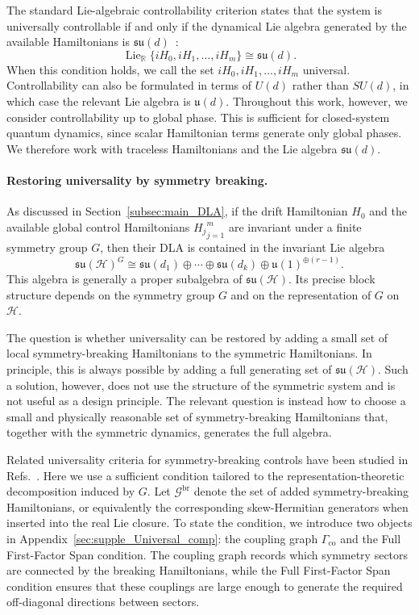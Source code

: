 \documentclass[10pt,twocolumn,superscriptaddress,aps,amsmath,amssymb,citeautoscript,floatfix,prx]{revtex4-2}
\newcounter{alg}
\theoremstyle{plain}
\theoremstyle{plain}
\theoremstyle{plain}
\theoremstyle{plain}
\theoremstyle{plain}
\theoremstyle{plain}
\theoremstyle{plain}
\theoremstyle{definition}
\theoremstyle{plain}
\begin{document}
The standard Lie-algebraic controllability criterion states that the system is universally controllable if and only if 
the dynamical Lie algebra generated by the available Hamiltonians is $\mathfrak{su}(d)$~\cite{Albertini2003}:
$$
\operatorname{Lie}_{\mathbb R}
\{iH_0,iH_1,\ldots,iH_m\}
\cong
\mathfrak{su}(d).
$$
When this condition holds, we call the set ${iH_0,iH_1,\ldots,iH_m}$ universal. Controllability can also be formulated in terms of $U(d)$ rather than $SU(d)$, 
in which case the relevant Lie algebra is $\mathfrak{u}(d)$. Throughout this work, however, we consider controllability up to global phase. 
This is sufficient for closed-system quantum dynamics, since scalar Hamiltonian terms generate only global phases. 
We therefore work with traceless Hamiltonians and the Lie algebra $\mathfrak{su}(d)$.

\paragraph{Restoring universality by symmetry breaking.}

As discussed in Section~\ref{subsec:main_DLA}, if the drift Hamiltonian $H_0$ and the available global control Hamiltonians ${H_j}_{j=1}^m$ are invariant under a finite symmetry group $G$, 
then their DLA is contained in the invariant Lie algebra
$$
\mathfrak{su}(\mathcal H)^G
\cong
\mathfrak{su}(d_1)
\oplus
\cdots
\oplus
\mathfrak{su}(d_k)
\oplus
\mathfrak{u}(1)^{\oplus(r-1)}.
$$
This algebra is generally a proper subalgebra of $\mathfrak{su}(\mathcal H)$. 
Its precise block structure depends on the symmetry group $G$ and on the representation of $G$ on $\mathcal H$.

The question is whether universality can be restored by adding a small set of local symmetry-breaking Hamiltonians to the symmetric Hamiltonians. 
In principle, this is always possible by adding a full generating set of $\mathfrak{su}(\mathcal H)$. Such a solution, 
however, does not use the structure of the symmetric system and is not useful as a design principle. 
The relevant question is instead how to choose a small and physically reasonable set of symmetry-breaking Hamiltonians that, together with the symmetric dynamics, 
generates the full algebra.

Related universality criteria for symmetry-breaking controls have been studied in Refs.~\cite{Hu2025, AlbertiniDAlessandro2025}. 
Here we use a sufficient condition tailored to the representation-theoretic decomposition induced by $G$. Let $\mathcal G^{\mathrm{br}}$ denote the set of added symmetry-breaking Hamiltonians, 
or equivalently the corresponding skew-Hermitian generators when inserted into the real Lie closure. 
To state the condition, we introduce two objects in Appendix~\ref{sec:supple_Universal_comp}: 
the coupling graph $\Gamma_{\mathrm{co}}$ and the Full First-Factor Span condition. The coupling graph records which symmetry sectors are connected by the breaking Hamiltonians, 
while the Full First-Factor Span condition ensures that these couplings are large enough to generate the required off-diagonal directions between sectors.
\end{document}
